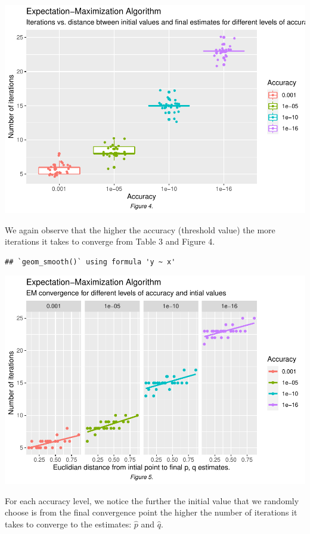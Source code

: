 \documentclass[]{article}
\begin{document}
\includegraphics{Rmarkdown_Faizan_HW1_CHL5224_Statistical_Genetics_files/figure-latex/unnamed-chunk-10-1.pdf}

We again observe that the higher the accuracy (threshold value) the more
iterations it takes to converge from Table 3 and Figure 4.

\begin{verbatim}
## `geom_smooth()` using formula 'y ~ x'
\end{verbatim}

\includegraphics{Rmarkdown_Faizan_HW1_CHL5224_Statistical_Genetics_files/figure-latex/unnamed-chunk-11-1.pdf}

For each accuracy level, we notice the further the initial value that we
randomly choose is from the final convergence point the higher the
number of iterations it takes to converge to the estimates: \(\hat{p}\)
and \(\hat{q}\).
\end{document}
